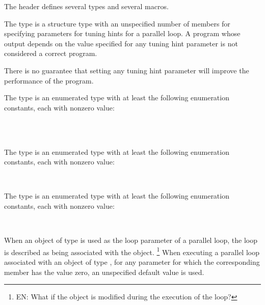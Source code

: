 

\pnum
The header
defines several types and several macros.

\pnum
The
type is a structure type
with an unspecified number of members
for specifying parameters for tuning hints for a parallel loop.
A program whose output
depends on the value specified for any tuning hint parameter
is not considered a correct program.

\begin{note}
There is no guarantee that setting any tuning hint parameter
will improve the performance of the program.
\end{note}

\pnum
The
type is an enumerated type
with at least the following enumeration constants,
each with nonzero value:

\begin{ttfamily}
\\
\\
\end{ttfamily}

\pnum
The
type is an enumerated type
with at least the following enumeration constants,
each with nonzero value:

\begin{ttfamily}
\\
\end{ttfamily}

\pnum
The
type is an enumerated type
with at least the following enumeration constants,
each with nonzero value:

\begin{ttfamily}
\\
\end{ttfamily}

\pnum
When an object of type
is used as the loop parameter of a parallel loop,
the loop is described as being associated with the object.%
\footnote{EN:
What if the object is modified during the execution of the loop?
}
When executing a parallel loop associated with an object of type
,
for any parameter for which the corresponding member has the value zero,
an unspecified default value is used.

